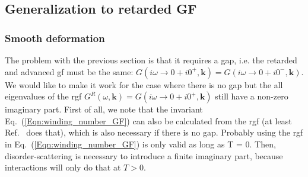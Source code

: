 \documentclass[english]{scrartcl}
\newcommand{\eq}[1]{Eq.~(\ref{#1})}
\begin{document}
\subsection{Generalization to retarded GF}
\subsubsection{Smooth deformation}
The problem with the previous section is that it requires a gap, i.e. the retarded and advanced \gls{gf} must be the same: $G(i\omega \to 0 + i 0^+, \bm k) = G(i\omega \to 0 + i 0^-, \bm k)$. We would like to make it work for the case where there is no gap but the all eigenvalues of the \gls{rgf} $G^R(\omega, \bm k) = G(i\omega \to 0 + i 0^+, \bm k)$ still have a  non-zero imaginary part. First of all, we note that the invariant \eq{Eqn:winding_number_GF} can also be calculated from the \gls{rgf} (at least Ref.~\cite{TFT_TI} does that), which is also necessary if there is no gap. {\color{red} Probably using the \gls{rgf} in \eq{Eqn:winding_number_GF} is only valid as long as T = 0. Then, disorder-scattering is necessary to introduce a finite imaginary part, because interactions will only do that at $T >0$.}
\end{document}
